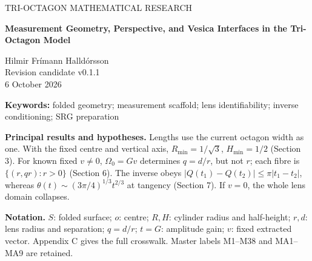 \documentclass[11pt,a4paper]{article}
\begin{document}
\begin{center}
{\small\color{MidnightBlue} TRI-OCTAGON MATHEMATICAL RESEARCH}\\[7mm]
{\LARGE\bfseries Measurement Geometry, Perspective, and Vesica Interfaces in the Tri-Octagon Model\par}\vspace{5mm}
{\large Hilmir Frímann Halldórsson}\\[3mm]
Revision candidate v0.1.1\\6 October 2026
\end{center}
\begin{abstract}
We give an exact account of the measurement geometry and adopted lens-to-state interface of the Tri-Octagon model. The width-one folded module is enclosed by the minimum centered vertical cylinder of radius \(1/\sqrt3\) and half-height \(1/2\). Its highest measurement ring is distinct from the nonplanar upper rim. Explicit projections separate normal, seam and tangent directions, and distinguish a measurement polygon from a regular reference hexagon. Historical changes of units are separated from fixed-centre changes of construction. For fixed nonzero extraction data, the lens initializer retains only the ratio \(d/r\); its fibres are positive scaling rays. Ratio recovery from amplitude is sharply Lipschitz, while angle recovery at tangency is Hölder. Deterministic vector error and finite-transfer attenuation explain conditioning without restoring absent absolute scale. Conditional enclosing hosts are retained in appendices. The cylinder is a static measurement definition and the oriented lens remains a kinematic interface; neither is assigned a material or rotational law.
\end{abstract}
\noindent\textbf{Keywords:} folded geometry; measurement scaffold; lens identifiability; inverse conditioning; SRG preparation\par
\vspace{3mm}
\textbf{Principal results and hypotheses.}
Lengths use the current octagon width as one. With the fixed centre and vertical axis, \(R_{\min}=1/\sqrt3\), \(H_{\min}=1/2\) (Section 3).
For known fixed \(v\ne0\), \(\Omega_0=Gv\) determines \(q=d/r\), but not \(r\); each fibre is \(\{(r,qr):r>0\}\) (Section 6).
The inverse obeys \(|Q(t_1)-Q(t_2)|\le\pi|t_1-t_2|\), whereas \(\theta(t)\sim(3\pi/4)^{1/3}t^{2/3}\) at tangency (Section 7). If \(v=0\), the whole lens domain collapses.

\textbf{Notation.} \(S\): folded surface; \(o\): centre; \(R,H\): cylinder radius and half-height; \(r,d\): lens radius and separation; \(q=d/r\); \(t=G\): amplitude gain; \(v\): fixed extracted vector. Appendix C gives the full crosswalk. Master labels M1--M38 and MA1--MA9 are retained.
\clearpage
\begingroup\small\setcounter{tocdepth}{1}\tableofcontents\endgroup
\clearpage
\end{document}
